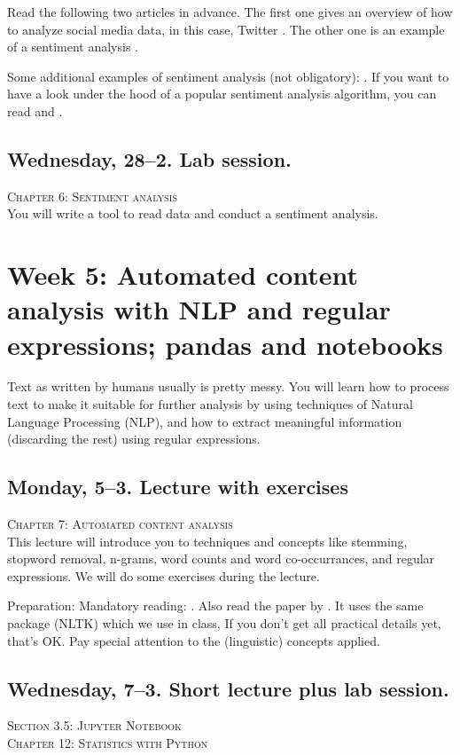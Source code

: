 \documentclass[a4paper,12pt]{report}
\begin{document}
Read the following two articles in advance. The first one gives an overview of how to analyze social media data, in this case, Twitter \citep{Bruns2013}. The other one is an example of a sentiment analysis \citep{Mostafa2013}.

Some additional examples of sentiment analysis (not obligatory): \cite{Huang2007,Pestian2012}. If you want to have a look under the hood of a popular sentiment analysis algorithm, you can read \cite{Thelwall2012} and \cite{Hutto2014}.


\subsection*{Wednesday, 28--2. Lab session.}
\textsc{ Chapter 6: Sentiment analysis}\\
You will write a tool to read data and conduct a sentiment analysis.






\section*{Week 5: Automated content analysis with NLP and regular expressions; pandas and notebooks}
Text as written by humans usually is pretty messy. You will learn how to process text to make it suitable for further analysis by using techniques of Natural Language Processing (NLP), and how to extract meaningful information (discarding the rest) using regular expressions.


\subsection*{Monday, 5--3. Lecture with exercises}
\textsc{ Chapter 7: Automated content analysis}\\
This lecture will introduce you to techniques and concepts like stemming, stopword removal, n-grams, word counts and word co-occurrances, and regular expressions. We will do some exercises during the lecture.

Preparation: Mandatory reading: \citealp{Boumans2016}. Also read the paper by \cite{Madnani}. It uses the same package (NLTK) which we use in class, If you don’t get all practical details yet, that’s OK. Pay special attention to the (linguistic) concepts applied.  

\subsection*{Wednesday, 7--3. Short lecture plus lab session.}
\textsc{ Section 3.5: Jupyter Notebook}\\
\textsc{ Chapter 12: Statistics with Python}\\
\end{document}

